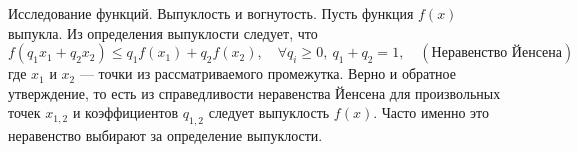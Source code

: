 \documentclass[8pt]{beamer}
\begin{document}
\begin{frame}{Исследование функций. Выпуклость и вогнутость.}
 Пусть функция $f(x)$ выпукла. Из определения выпуклости следует, что
 $$f(q_1 x_1+q_2 x_2)\le q_1 f(x_1)+q_2 f(x_2) ,\quad \forall q_i\ge0,\ q_1+q_2=1,\quad (\text{Неравенство Йенсена})$$
 где $x_1$ и $x_2$ --- точки из рассматриваемого промежутка. Верно и обратное утверждение, то есть из справедливости неравенства Йенсена для произвольных точек $x_{1,2}$ и коэффициентов $q_{1,2}$ следует выпуклость $f(x)$. Часто именно это неравенство выбирают за определение выпуклости.
 \begin{center}

\end{center}
\end{frame}
\end{document}
